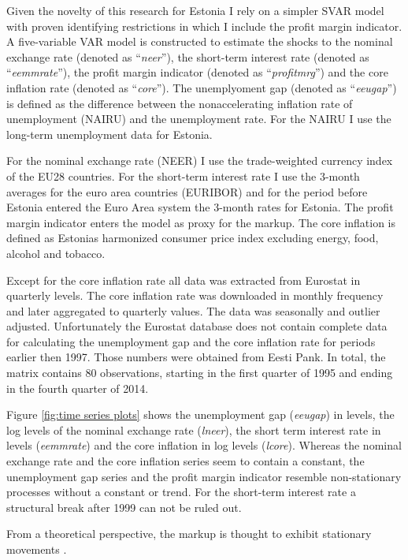 \documentclass[twoside]{article}
\begin{document}
\begin{multicols}{2}
Given the novelty of this research for Estonia I rely on a simpler SVAR model with proven identifying restrictions in which I include the profit margin indicator. A five-variable VAR model is constructed to estimate the shocks to the nominal exchange rate (denoted as ``\textit{neer}''), the short-term interest rate (denoted as ``\textit{eemmrate}''), the profit margin indicator (denoted as ``\textit{profitmrg}'') and the core inflation rate (denoted as ``\textit{core}''). The unemplyoment gap (denoted as ``\textit{eeugap}'') is defined as the  difference between the nonaccelerating inflation rate of unemployment (NAIRU) and the unemployment rate. For the NAIRU I use the long-term unemployment  data for Estonia. 

For the nominal exchange rate (NEER) I use the trade-weighted currency index of the EU28 countries. For the short-term interest rate I use the 3-month averages for the euro area countries (EURIBOR) and for the period before Estonia entered the Euro Area system the 3-month rates for Estonia.  The profit margin indicator enters the model as proxy for the markup. The core inflation is defined as Estonias harmonized consumer price index excluding energy, food, alcohol  and tobacco. 

Except for the core inflation rate all data was extracted from Eurostat in quarterly levels. The core inflation rate was downloaded in monthly frequency and later aggregated to quarterly values. The data was seasonally and outlier adjusted. Unfortunately the Eurostat database does not contain complete data for calculating the unemployment gap and the core inflation rate for periods earlier then 1997. Those numbers were obtained from Eesti Pank. In total, the matrix contains 80 observations,  starting in the first quarter of 1995 and ending in the fourth quarter of 2014.  

Figure \ref{fig:time series plots} shows the unemployment gap (\textit{eeugap}) in levels, the log levels of the nominal exchange rate (\textit{lneer}), the short term interest rate in levels (\textit{eemmrate}) and the core inflation in log levels (\textit{lcore}). Whereas the nominal exchange rate and the core inflation series seem to contain a constant, the unemployment gap series and the profit margin indicator resemble non-stationary processes without a constant or trend. For the short-term interest rate a structural break after 1999 can not be ruled out. 


From a theoretical perspective, the markup is thought to exhibit stationary movements \citep{Khan2013Markups}.


\end{multicols}
\end{document}
